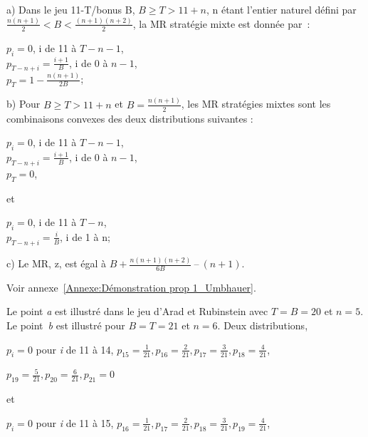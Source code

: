 \begin{Article}
\begin{refsection}[UmbhauerFR]

\begin{proposition}

a) Dans le jeu 11-T/bonus B, \(B \geq T > 11 + n\), n étant
l'entier naturel défini par \(\frac{n(n + 1)}{2} < B < \frac{(n + 1)(n + 2)}{2}\), la MR
stratégie mixte est donnée par~:

{\centering
$p_{i} = 0$, i de 11 à $T-n-1$, \\
$p_{T - n + i} = \frac{i + 1}{B}$, i de 0 à $n-1$,  \\
$p_{T} = 1 - \frac{n(n + 1)}{2B}$;\par}

b) Pour \(B \geq T > 11 + n\) et \(B=\frac{n(n + 1)}{2}\), les MR stratégies mixtes sont les combinaisons convexes des deux distributions suivantes :

{\centering
$p_{i} = 0$, i de 11 à $T-n-1$, \\
$p_{T - n + i} = \frac{i + 1}{B}$, i de 0 à $n-1$, \\
$p_{T} = 0$,\par}

et

{\centering
$p_{i} = 0$, i de 11 à $T-n$, \\
$p_{T - n + i} = \frac{i}{B}$, i de 1 à n;\par}

c) Le MR, z, est égal à
\(B + \frac{n(n + 1)(n + 2)}{6B}\ –\ (n + 1)\).
\end{proposition}

\begin{demonstration}
    Voir annexe~\ref{Annexe:Démonstration prop 1_Umbhauer}. \quad \blacksquare
\end{demonstration}

Le point \emph{a} est illustré dans le jeu d'Arad et Rubinstein avec \(T = B = 20\) et
\(n = 5\). Le point~\emph{b} est illustré pour \(B = T = 21\) et \(n = 6\). Deux distributions,

{\centering \(p_{i} = 0\) pour \emph{i} de 11 à 14,
$p_{15} = \frac{1}{21}, p_{16} = \frac{2}{21}, p_{17} = \frac{3}{21}, p_{18} = \frac{4}{21}$,\par}

{\centering \(p_{19} = \frac{5}{21}, p_{20} = \frac{6}{21}, p_{21} = 0\)\par}

\noindent et

{\centering $p_{i} = 0$ pour \emph{i} de 11 à 15,
$p_{16} = \frac{1}{21}, p_{17} = \frac{2}{21}, p_{18} = \frac{3}{21}, p_{19} = \frac{4}{21}$,\par} 


\end{refsection}
\end{Article}
